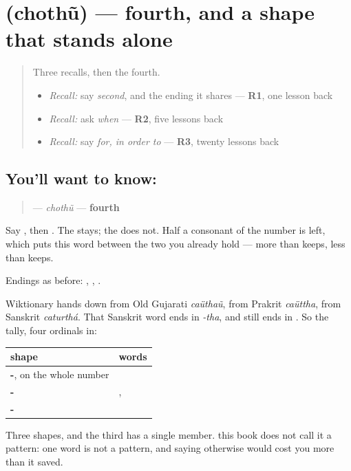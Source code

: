 \section[\texorpdfstring{\gu{ચોથું} (chothũ)}{ચોથું (chothũ)}]{ (chothũ) — fourth, and a shape that stands alone}

\label{lesson:GU-C38-chothu}



\begin{quote}
Three recalls, then the fourth.

\begin{itemize}
\raggedright
  \item \emph{Recall:} say \emph{second}, and the ending it shares — \textbf{R1}, one lesson back
  \item \emph{Recall:} ask \emph{when} — \textbf{R2}, five lessons back
  \item \emph{Recall:} say \emph{for, in order to} — \textbf{R3}, twenty lessons back
\end{itemize}
\end{quote}

\subsection*{You'll want to know: }
\begin{quote}
\textbf{} — \emph{chothũ} — \textbf{fourth}
\end{quote}

Say \textbf{}, then \textbf{}. The \textbf{} stays; the \textbf{} does not. Half a consonant of the number is left, which puts this word between the two you already hold — more than \textbf{} keeps, less than \textbf{} keeps.

Endings as before: \textbf{}, \textbf{}, \textbf{}.

\begin{grammarlens}[title={What you've built: three shapes, one of them alone}]
Wiktionary hands \textbf{} down from Old Gujarati \emph{caüthaũ}, from Prakrit \emph{caüttha}, from Sanskrit \emph{caturthá}. That Sanskrit word ends in \emph{-tha}, and \textbf{} still ends in \textbf{}. So the tally, four ordinals in:

\noindent
\begin{tabularx}{\linewidth}{@{}>{\raggedright\arraybackslash}X>{\raggedright\arraybackslash}X@{}}
\toprule
\textbf{shape} & \textbf{words} \\
\midrule
\textbf{-\gu{મું}}, on the whole number & \textbf{\gu{પાંચમું}} \\
\textbf{-\gu{ીજું}} & \textbf{\gu{બીજું}}, \textbf{\gu{ત્રીજું}} \\
\textbf{-\gu{થું}} & \textbf{\gu{ચોથું}} \\
\bottomrule
\end{tabularx}

Three shapes, and the third has a single member. \textbf{} this book does not call it a pattern: one word is not a pattern, and saying otherwise would cost you more than it saved.
\end{grammarlens}

